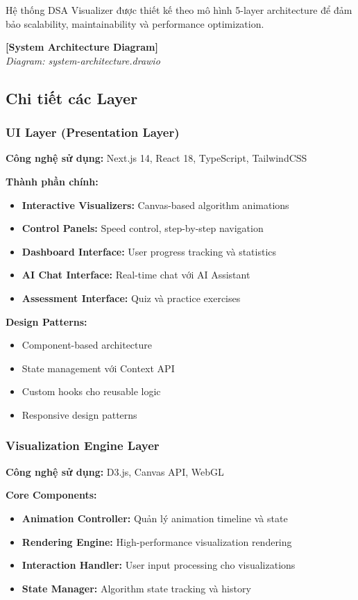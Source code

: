 Hệ thống DSA Visualizer được thiết kế theo mô hình 5-layer architecture để đảm bảo scalability, maintainability và performance optimization.

\begin{center}
\textbf{[System Architecture Diagram]}\\
\textit{Diagram: system-architecture.drawio}
\end{center}

\subsection{Chi tiết các Layer}

\subsubsection{UI Layer (Presentation Layer)}
\textbf{Công nghệ sử dụng:} Next.js 14, React 18, TypeScript, TailwindCSS

\textbf{Thành phần chính:}
\begin{itemize}
    \item \textbf{Interactive Visualizers:} Canvas-based algorithm animations
    \item \textbf{Control Panels:} Speed control, step-by-step navigation
    \item \textbf{Dashboard Interface:} User progress tracking và statistics
    \item \textbf{AI Chat Interface:} Real-time chat với AI Assistant
    \item \textbf{Assessment Interface:} Quiz và practice exercises
\end{itemize}

\textbf{Design Patterns:}
\begin{itemize}
    \item Component-based architecture
    \item State management với Context API
    \item Custom hooks cho reusable logic
    \item Responsive design patterns
\end{itemize}

\subsubsection{Visualization Engine Layer}
\textbf{Công nghệ sử dụng:} D3.js, Canvas API, WebGL

\textbf{Core Components:}
\begin{itemize}
    \item \textbf{Animation Controller:} Quản lý animation timeline và state
    \item \textbf{Rendering Engine:} High-performance visualization rendering
    \item \textbf{Interaction Handler:} User input processing cho visualizations
    \item \textbf{State Manager:} Algorithm state tracking và history
\end{itemize}

